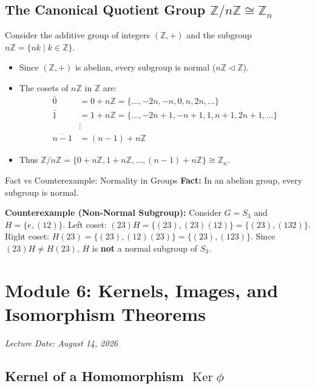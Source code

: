 \documentclass[11pt,a4paper]{article}
\begin{document}
\subsection{The Canonical Quotient Group \texorpdfstring{$\mathbb{Z}/n\mathbb{Z} \cong \mathbb{Z}_n$}{Z/nZ = Zn}}

Consider the additive group of integers $(\mathbb{Z}, +)$ and the subgroup $n\mathbb{Z} = \{ nk \mid k \in \mathbb{Z} \}$.
\begin{itemize}
    \item Since $(\mathbb{Z}, +)$ is abelian, every subgroup is normal ($n\mathbb{Z} \triangleleft \mathbb{Z}$).
    \item The cosets of $n\mathbb{Z}$ in $\mathbb{Z}$ are:
    \begin{align}
        \bar{0} &= 0 + n\mathbb{Z} = \{ \dots, -2n, -n, 0, n, 2n, \dots \} \\
        \bar{1} &= 1 + n\mathbb{Z} = \{ \dots, -2n+1, -n+1, 1, n+1, 2n+1, \dots \} \\
        &\vdots \nonumber \\
        \overline{n-1} &= (n-1) + n\mathbb{Z}
    \end{align}
    \item Thus $\mathbb{Z}/n\mathbb{Z} = \{ 0+n\mathbb{Z}, 1+n\mathbb{Z}, \dots, (n-1)+n\mathbb{Z} \} \cong \mathbb{Z}_n$.
\end{itemize}

\begin{exbox}{Fact vs Counterexample: Normality in Groups}
\textbf{Fact:} In an abelian group, every subgroup is normal.

\textbf{Counterexample (Non-Normal Subgroup):} Consider $G = S_3$ and $H = \{e, (12)\}$.
Left coset: $(23)H = \{(23), (23)(12)\} = \{(23), (132)\}$.
Right coset: $H(23) = \{(23), (12)(23)\} = \{(23), (123)\}$.
Since $(23)H \neq H(23)$, $H$ is \textbf{not} a normal subgroup of $S_3$.
\end{exbox}

\newpage

\section{Module 6: Kernels, Images, and Isomorphism Theorems}
\textit{Lecture Date: August 14, 2026}

\subsection{Kernel of a Homomorphism \texorpdfstring{$\operatorname{Ker} \phi$}{Ker phi}}
\end{document}
